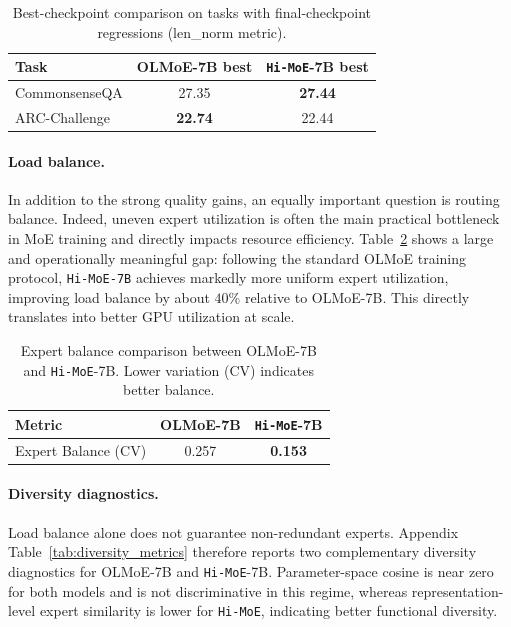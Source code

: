 \documentclass[sigconf,nonacm]{acmart}
\begin{document}
\begin{table}[!htbp]
\centering
\caption{Best-checkpoint comparison on tasks with final-checkpoint regressions (len\_norm metric).}
\label{tab:olmoe7b_best}
\setlength{\tabcolsep}{6pt}
\begin{tabular}{lcc}
\toprule
\textbf{Task} & \textbf{OLMoE-7B best} & \textbf{\texttt{Hi-MoE}-7B best} \\
\midrule
CommonsenseQA  & 27.35 & \textbf{27.44} \\
ARC-Challenge & \textbf{22.74} & 22.44 \\
\bottomrule
\end{tabular}
\end{table}

\paragraph{Load balance.}
In addition to the strong quality gains, an equally important question is routing balance. Indeed, uneven expert utilization is often the main practical bottleneck in MoE training and directly impacts resource efficiency. Table~\ref{tab:olmoe7b_summary} shows a large and operationally meaningful gap: following the standard OLMoE training protocol, \texttt{Hi-MoE-7B} achieves markedly more uniform expert utilization, improving load balance by about $40\%$ relative to OLMoE-7B. This directly translates into better GPU utilization at scale.

\begin{table}[!htbp]
\centering
\caption{Expert balance comparison between OLMoE-7B and \texttt{Hi-MoE}-7B. Lower variation (CV) indicates better balance.}
\label{tab:olmoe7b_summary}
\setlength{\tabcolsep}{8pt}
\begin{tabular}{lcc}
\toprule
\textbf{Metric} & \textbf{OLMoE-7B} & \textbf{\texttt{Hi-MoE}-7B} \\
\midrule
Expert Balance (CV) & 0.257 & \textbf{0.153} \\
\bottomrule
\end{tabular}
\end{table}

\paragraph{Diversity diagnostics.}
Load balance alone does not guarantee non-redundant experts. Appendix Table~\ref{tab:diversity_metrics} therefore reports two complementary diversity diagnostics for OLMoE-7B and \texttt{Hi-MoE}-7B. Parameter-space cosine is near zero for both models and is not discriminative in this regime, whereas representation-level expert similarity is lower for \texttt{Hi-MoE}, indicating better functional diversity.
\end{document}
